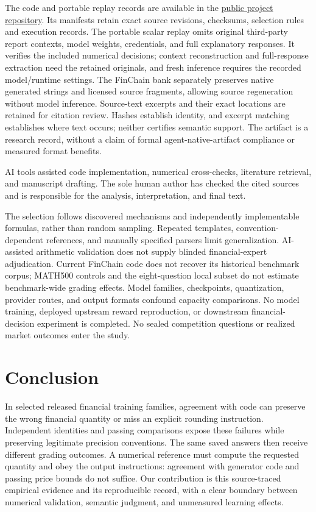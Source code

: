 The code and portable replay records are available in the \href{https://github.com/SebastianBoehler/agenthon-forecast-provenance-audit}{public project repository}. Its manifests retain exact source revisions, checksums, selection rules and execution records. The portable scalar replay omits original third-party report contexts, model weights, credentials, and full explanatory responses. It verifies the included numerical decisions; context reconstruction and full-response extraction need the retained originals, and fresh inference requires the recorded model/runtime settings. The FinChain bank separately preserves native generated strings and licensed source fragments, allowing source regeneration without model inference. Source-text excerpts and their exact locations are retained for citation review. Hashes establish identity, and excerpt matching establishes where text occurs; neither certifies semantic support. The artifact is a research record, without a claim of formal agent-native-artifact compliance or measured format benefits.

AI tools assisted code implementation, numerical cross-checks, literature retrieval, and manuscript drafting. The sole human author has checked the cited sources and is responsible for the analysis, interpretation, and final text.

The selection follows discovered mechanisms and independently implementable formulas, rather than random sampling. Repeated templates, convention-dependent references, and manually specified parsers limit generalization. AI-assisted arithmetic validation does not supply blinded financial-expert adjudication. Current FinChain code does not recover its historical benchmark corpus; MATH500 controls and the eight-question local subset do not estimate benchmark-wide grading effects. Model families, checkpoints, quantization, provider routes, and output formats confound capacity comparisons. No model training, deployed upstream reward reproduction, or downstream financial-decision experiment is completed. No sealed competition questions or realized market outcomes enter the study.

\section{Conclusion}
In selected released financial training families, agreement with code can preserve the wrong financial quantity or miss an explicit rounding instruction. Independent identities and passing comparisons expose these failures while preserving legitimate precision conventions. The same saved answers then receive different grading outcomes. A numerical reference must compute the requested quantity and obey the output instructions: agreement with generator code and passing price bounds do not suffice. Our contribution is this source-traced empirical evidence and its reproducible record, with a clear boundary between numerical validation, semantic judgment, and unmeasured learning effects.

